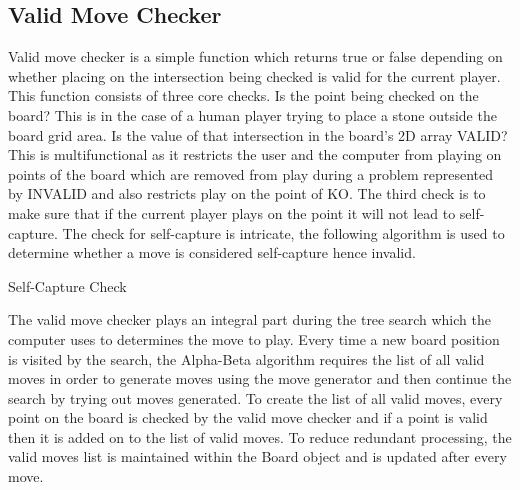 \documentclass{l4proj}
\begin{document}
\subsection{Valid Move Checker}
Valid move checker is a simple function which returns true or false depending on whether placing on the intersection being checked is valid for the current player. This function consists of three core checks. Is the point being checked on the board? This is in the case of a human player trying to place a stone outside the board grid area. Is the value of that intersection in the board’s 2D array VALID? This is multifunctional as it restricts the user and the computer from playing on points of the board which are removed from play during a problem represented by INVALID and also restricts play on the point of KO. The third check is to make sure that if the current player plays on the point it will not lead to self-capture. The check for self-capture is intricate, the following algorithm is used to determine whether a move is considered self-capture hence invalid.

\begin{algorithm}[H]
\caption{Self-Capture Check}\label{Self-Capture Check}
    \DontPrintSemicolon
\end{algorithm}

The valid move checker plays an integral part during the tree search which the computer uses to determines the move to play. Every time a new board position is visited by the search, the Alpha-Beta algorithm requires the list of all valid moves in order to generate moves using the move generator and then continue the search by trying out moves generated. To create the list of all valid moves, every point on the board is checked by the valid move checker and if a point is valid then it is added on to the list of valid moves. To reduce redundant processing, the valid moves list is maintained within the Board object and is updated after every move.
\end{document}
